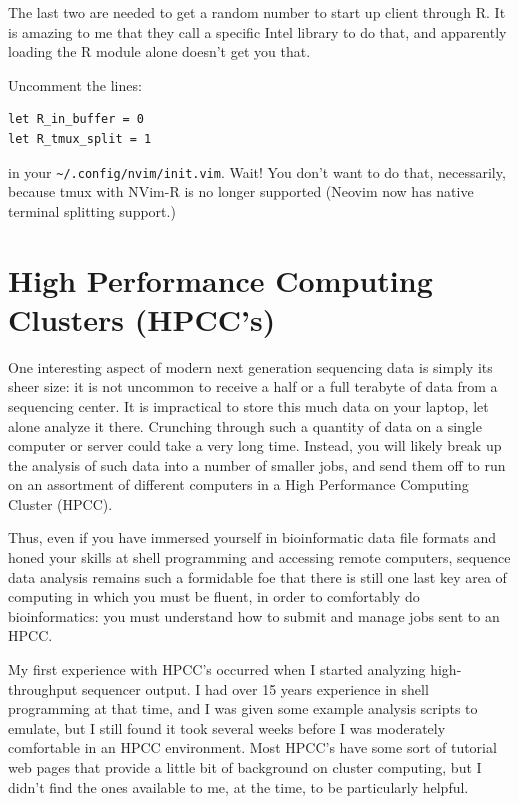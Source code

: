 \documentclass[]{krantz}
\begin{document}
The last two are needed to get a random number to start up client through R.
It is amazing to me that they call a specific Intel library to do that, and apparently
loading the R module alone doesn't get you that.

Uncomment the lines:

\begin{verbatim}
let R_in_buffer = 0                                                       
let R_tmux_split = 1 
\end{verbatim}

in your \texttt{\textasciitilde{}/.config/nvim/init.vim}. Wait! You don't want to do that, necessarily, because tmux with NVim-R
is no longer supported (Neovim now has native terminal splitting support.)

\hypertarget{high-performance-computing-clusters-hpccs}{%
\chapter{High Performance Computing Clusters (HPCC's)}\label{high-performance-computing-clusters-hpccs}}

One interesting aspect of modern next generation sequencing data is simply its
sheer size: it is not uncommon to receive a half or a full terabyte of data from
a sequencing center. It is impractical to store this much data on your
laptop, let alone analyze it there. Crunching through such a quantity of data on a single
computer or server could take a very long time. Instead, you will likely break
up the analysis of such data into a number of smaller jobs, and send them off to
run on an assortment of different computers in a High Performance Computing Cluster (HPCC).

Thus, even if you have immersed yourself in bioinformatic data file formats and honed
your skills at shell programming and accessing remote computers, sequence data analysis
remains such a formidable foe that there is still one last key area of computing
in which you must be fluent, in order to comfortably do bioinformatics: you must understand
how to submit and manage jobs sent to an HPCC.

My first experience with HPCC's occurred when I started analyzing
high-throughput sequencer output. I had over 15 years experience in shell
programming at that time, and I was given some example analysis scripts to emulate, but I still
found it took several weeks before I was moderately comfortable in an HPCC environment. Most
HPCC's have some sort of tutorial web pages that provide a little bit of background
on cluster computing, but I didn't find the ones available to me, at the time, to
be particularly helpful.
\end{document}
